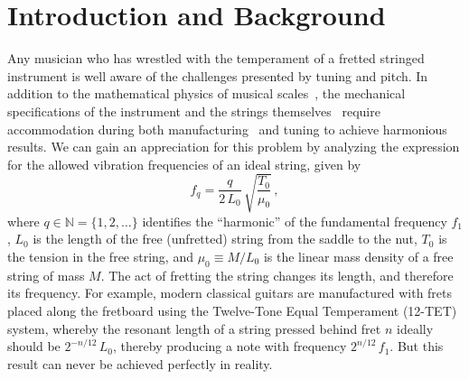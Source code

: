 %
%
%

 \section{Introduction and Background\label{sct:intro}}

Any musician who has wrestled with the temperament of a fretted stringed instrument is well aware of the challenges presented by tuning and pitch. In addition to the mathematical physics of musical scales~\cite{ref:krantz1994mre,ref:hall2001mmi,ref:durfee2015pms}, the mechanical specifications of the instrument and the strings themselves~\cite{ref:morse1981vas,ref:fletcher2005pmi,ref:ramsey2023fag} require accommodation during both manufacturing~\cite{ref:byersgal,ref:byers1996cgi,ref:varieschi2010icf} and tuning to achieve harmonious results. We can gain an appreciation for this problem by analyzing the expression for the allowed vibration frequencies of an ideal string, given by~\cite{ref:morse1981vsa,ref:fletcher2005pma}
 \begin{equation} \label{eqn:f_0_def}
f_q = \frac{q}{2\, L_0}\, \sqrt{\frac{T_0}{\mu_0}}\, ,
 \end{equation}
where $q \in \mathbb{N} = \{1, 2, \dots\}$ identifies the ``harmonic'' of the fundamental frequency $f_1$, $L_0$ is the length of the free (unfretted) string from the saddle to the nut, $T_0$ is the tension in the free string, and $\mu_0 \equiv M / L_0$ is the linear mass density of a free string of mass $M$. The act of fretting the string changes its length, and therefore its frequency. For example, modern classical guitars are manufactured with frets placed along the fretboard using the Twelve-Tone Equal Temperament (12-TET) system, whereby the resonant length of a string pressed behind fret $n$ ideally should be $2^{-n/12}\, L_0$, thereby producing a note with frequency $2^{n/12}\, f_1$. But this result can never be achieved perfectly in reality. 

